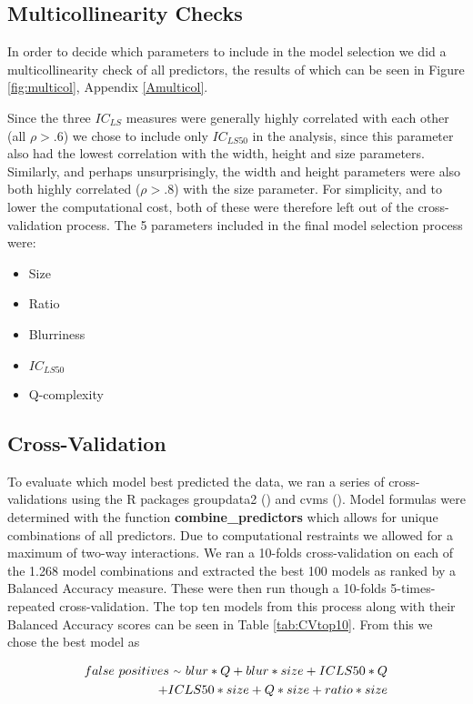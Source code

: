 \documentclass[12pt]{article}
\newcommand{\mytilde}{\raise.17ex\hbox{$\scriptstyle\mathtt{\sim}$}} %
\begin{document}
\subsection{Multicollinearity Checks}
In order to decide which parameters to include in the model selection we did a multicollinearity check of all predictors, the results of which can be seen in Figure \ref{fig:multicol}, Appendix \ref{Amulticol}.

Since the three $IC_{LS}$ measures were generally highly correlated with each other (all $\rho > .6$) we chose to include only $IC_{LS50}$ in the analysis, since this parameter also had the lowest correlation with the width, height and size parameters. 
Similarly, and perhaps unsurprisingly, the width and height parameters were also both highly correlated ($\rho > .8$) with the size parameter. For simplicity, and to lower the computational cost, both of these were therefore left out of the cross-validation process.
The 5 parameters included in the final model selection process were:
\begin{itemize}
	\item Size
	\item Ratio
	\item Blurriness
	\item $IC_{LS50}$
	\item Q-complexity
\end{itemize}

\subsection{Cross-Validation}
To evaluate which model best predicted the data, we ran a series of cross-validations using the R packages groupdata2 (\cite{olsenGroupdata22020}) and cvms (\cite{olsenCvms2020}).
Model formulas were determined with the function \textbf{combine\_predictors} which allows for unique combinations of all predictors. Due to computational restraints we allowed for a maximum of two-way interactions. We ran a 10-folds cross-validation on each of the 1.268 model combinations and extracted the best 100 models as ranked by a Balanced Accuracy measure. These were then run though a 10-folds 5-times-repeated cross-validation. The top ten models from this process along with their Balanced Accuracy scores can be seen in Table \ref{tab:CVtop10}. From this we chose the best model as

\begin{equation*}
	\begin{aligned}
		 false \ positives \ \mytilde \ blur*Q + blur*size + ICLS50*Q \\
		 + ICLS50*size + Q*size + ratio*size
	\end{aligned}
	\label{eq:bestmodel}
\end{equation*} 
\end{document}
